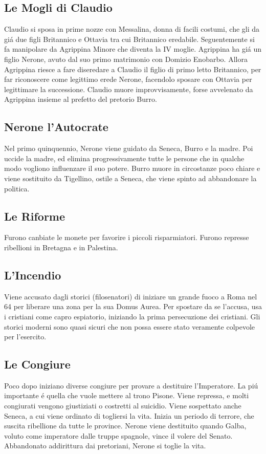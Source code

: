 \documentclass{article}
\begin{document}
\subsection{Le Mogli di Claudio}
Claudio si sposa in prime nozze con Messalina, donna di facili costumi, che gli da giá due figli Britannico e Ottavia tra cui Britannico eredabile. Seguentemente si fa manipolare da Agrippina Minore che diventa la IV moglie.
Agrippina ha giá un figlio Nerone, avuto dal suo primo matrimonio con Domizio Enobarbo. Allora Agrippina riesce a fare diseredare a Claudio il figlio di primo letto Britannico, per far riconoscere come legittimo erede Nerone, facendolo sposare con Ottavia per legittimare la successione. Claudio muore improvvisamente, forse avvelenato da Agrippina insieme al prefetto del pretorio Burro.

\subsection{Nerone l'Autocrate}
Nel primo quinquennio, Nerone viene guidato da Seneca, Burro e la madre. Poi uccide la madre, ed elimina progressivamente tutte le persone che in qualche modo vogliono influenzare il suo potere. Burro muore in circostanze poco chiare e viene sostituito da Tigellino, ostile a Seneca, che viene spinto ad abbandonare la politica.

\subsection{Le Riforme}
Furono canbiate le monete per favorire i piccoli risparmiatori. Furono represse ribellioni in Bretagna e in Palestina.

\subsection{L'Incendio}
Viene accusato dagli storici (filosenatori) di iniziare un grande fuoco a Roma nel 64 per liberare una zona per la sua Domus Aurea. Per spostare da se l'accusa, usa i cristiani come capro espiatorio, iniziando la prima persecuzione dei cristiani. Gli storici moderni sono quasi sicuri che non possa essere stato veramente colpevole per l'esercito.

\subsection{Le Congiure}
Poco dopo iniziano diverse congiure per provare a destituire l'Imperatore. La piú importante é quella che vuole mettere al trono Pisone. Viene repressa, e molti congiurati vengono giustiziati o costretti al suicidio. Viene sospettato anche Seneca, a cui viene ordinato di togliersi la vita. Inizia un periodo di terrore, che suscita ribellione da tutte le province. Nerone viene destituito quando Galba, voluto come imperatore dalle truppe spagnole, vince il volere del Senato. Abbandonato addirittura dai pretoriani, Nerone si toglie la vita.
\end{document}

